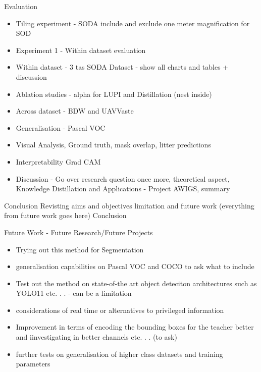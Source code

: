 Evaluation
\begin{itemize}
    \item Tiling experiment - SODA include and exclude one meter magnification for SOD

    \item Experiment 1 - Within dataset evaluation
    \item Within dataset - 3 tas SODA Dataset - show all charts and tables + discussion
    \item Ablation studies - alpha for LUPI and Distillation (nest inside)
    \item Across dataset - BDW and UAVVaste
    \item Generalisation - Pascal VOC
    \item Visual Analysis, Ground truth, mask overlap, litter predictions
    \item Interpretability Grad CAM
    \item Discussion - Go over research question once more, theoretical aspect, Knowledge Distillation and Applications - Project AWIGS, summary
\end{itemize}

Conclusion
Revisting aims and objectives
limitation and future work (everything from future work goes here)
Conclusion

Future Work - Future Research/Future Projects
\begin{itemize}
    \item Trying out this method for Segmentation
    \item generalisation capabilities on Pascal VOC and COCO to ask what to include
    \item Test out the method on state-of-the art object deteciton architectures such as YOLO11 etc. . . - can be a limitation
    \item considerations of real time or alternatives to privileged information
    \item Improvement in terms of encoding the bounding boxes for the teacher better and iinvestigating in better channels etc. . . (to ask)
    \item further tests on generalisation of higher class datasets and training parameters
\end{itemize}

